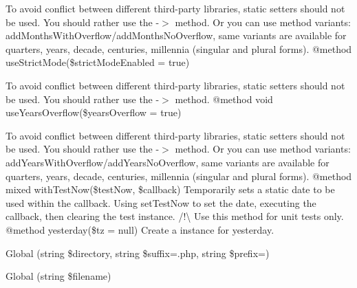 \begin{DoxyRefList}
To avoid conflict between different third-\/party libraries, static setters should not be used. You should rather use the -\/\texorpdfstring{$>$}{>} method. Or you can use method variants\+: add\+Months\+With\+Overflow/add\+Months\+No\+Overflow, same variants are available for quarters, years, decade, centuries, millennia (singular and plural forms). @method  use\+Strict\+Mode(\$strict\+Mode\+Enabled = true) 



To avoid conflict between different third-\/party libraries, static setters should not be used. You should rather use the -\/\texorpdfstring{$>$}{>} method. @method void use\+Years\+Overflow(\$years\+Overflow = true) 



To avoid conflict between different third-\/party libraries, static setters should not be used. You should rather use the -\/\texorpdfstring{$>$}{>} method. Or you can use method variants\+: add\+Years\+With\+Overflow/add\+Years\+No\+Overflow, same variants are available for quarters, years, decade, centuries, millennia (singular and plural forms). @method mixed with\+Test\+Now(\$test\+Now, \$callback) Temporarily sets a static date to be used within the callback. Using set\+Test\+Now to set the date, executing the callback, then clearing the test instance. /!\textbackslash{} Use this method for unit tests only. @method  yesterday(\$tz = null) Create a  instance for yesterday. 
\item[Global \doxylink{class_sebastian_bergmann_1_1_code_coverage_1_1_filter_ae4b17d7239ab5d74ab998154efc0c9d6}{Filter\+::exclude\+Directory} (string \$directory, string \$suffix=\textquotesingle{}.php\textquotesingle{}, string \$prefix=\textquotesingle{}\textquotesingle{})]\label{deprecated__deprecated000177}%
%
  
\item[Global \doxylink{class_sebastian_bergmann_1_1_code_coverage_1_1_filter_a0fffaa947ab67b85f1d6227c02971f81}{Filter\+::exclude\+File} (string \$filename)]\label{deprecated__deprecated000178}%
%
  

\end{DoxyRefList}
